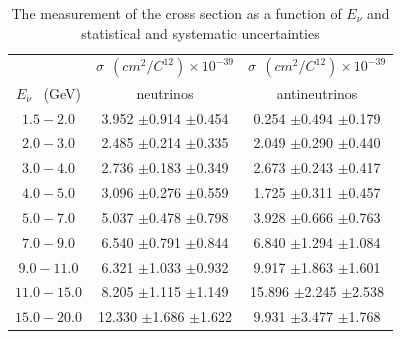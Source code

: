 \documentclass[aps,prl,twocolumn,showpacs,superscriptaddress,nofootinbib]{revtex4}
\begin{document}
\begingroup
\squeezetable
\begin{table}[h]
\tabcolsep=0.11cm
\begin{tabular}{c|c|c}
&  $\sigma\ \  (cm^{2}/C^{12})\times 10^{-39}$ & $\sigma\ \  (cm^{2}/C^{12})\times 10^{-39}$ \\
$E_{\nu}$ \ (GeV)& neutrinos & antineutrinos  \\
\hline
$1.5 - 2.0$ & 3.952 $\pm$0.914 $\pm$0.454 &0.254 $\pm$0.494 $\pm$0.179 \\
$2.0 - 3.0$ & 2.485 $\pm$0.214 $\pm$0.335 &2.049 $\pm$0.290 $\pm$0.440\\
$3.0 - 4.0$ & 2.736 $\pm$0.183 $\pm$0.349 &2.673 $\pm$0.243 $\pm$0.417\\
$4.0 - 5.0$ & 3.096 $\pm$0.276 $\pm$0.559 &1.725 $\pm$0.311 $\pm$0.457\\
$5.0 - 7.0$ & 5.037 $\pm$0.478 $\pm$0.798 &3.928 $\pm$0.666 $\pm$0.763\\
$7.0 - 9.0$ & 6.540 $\pm$0.791 $\pm$0.844 &6.840 $\pm$1.294 $\pm$1.084\\
$9.0 - 11.0$ & 6.321 $\pm$1.033 $\pm$0.932 &9.917 $\pm$1.863 $\pm$1.601\\
$11.0 - 15.0$ & 8.205 $\pm$1.115 $\pm$1.149 &15.896 $\pm$2.245 $\pm$2.538\\
$15.0 - 20.0$ & 12.330 $\pm$1.686 $\pm$1.622 &9.931 $\pm$3.477 $\pm$1.768\\
 


\end{tabular}
\caption{The measurement of the cross section as a function of $E_\nu$ and
statistical and systematic uncertainties}
\end{table}
\endgroup
\end{document}
